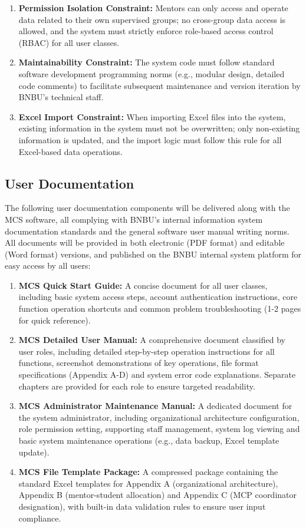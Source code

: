 \documentclass[a4paper,12pt]{article}
\begin{document}
\begin{enumerate}
\item \textbf{Permission Isolation Constraint:} Mentors can only access and operate data related to their own supervised groups; no cross-group data access is allowed, and the system must strictly enforce role-based access control (RBAC) for all user classes.
\item \textbf{Maintainability Constraint:} The system code must follow standard software development programming norms (e.g., modular design, detailed code comments) to facilitate subsequent maintenance and version iteration by BNBU's technical staff.
\item \textbf{Excel Import Constraint:} When importing Excel files into the system, existing information in the system must not be overwritten; only non-existing information is updated, and the import logic must follow this rule for all Excel-based data operations.
\end{enumerate}

\subsection{User Documentation}

The following user documentation components will be delivered along with the MCS software, all complying with BNBU's internal information system documentation standards and the general software user manual writing norms. All documents will be provided in both electronic (PDF format) and editable (Word format) versions, and published on the BNBU internal system platform for easy access by all users:

\begin{enumerate}
\item \textbf{MCS Quick Start Guide:} A concise document for all user classes, including basic system access steps, account authentication instructions, core function operation shortcuts and common problem troubleshooting (1-2 pages for quick reference).

\item \textbf{MCS Detailed User Manual:} A comprehensive document classified by user roles, including detailed step-by-step operation instructions for all functions, screenshot demonstrations of key operations, file format specifications (Appendix A-D) and system error code explanations. Separate chapters are provided for each role to ensure targeted readability.

\item \textbf{MCS Administrator Maintenance Manual:} A dedicated document for the system administrator, including organizational architecture configuration, role permission setting, supporting staff management, system log viewing and basic system maintenance operations (e.g., data backup, Excel template update).

\item \textbf{MCS File Template Package:} A compressed package containing the standard Excel templates for Appendix A (organizational architecture), Appendix B (mentor-student allocation) and Appendix C (MCP coordinator designation), with built-in data validation rules to ensure user input compliance.
\end{enumerate}
\end{document}
